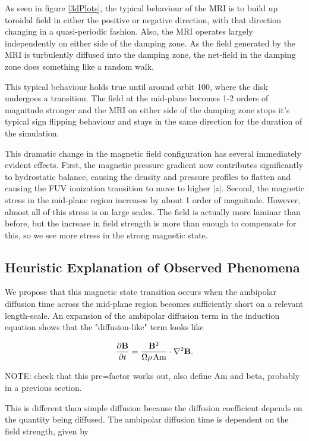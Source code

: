 As seen in figure \ref{3dPlots}, the typical behaviour of the MRI is to build up toroidal field in either the positive or negative direction, with that direction changing in a quasi-periodic fashion.  Also, the MRI operates largely independently on either side of the damping zone.  As the field generated by the MRI is turbulently diffused into the damping zone, the net-field in the damping zone does something like a random walk.  

This typical behaviour holds true until around orbit 100, where the disk undergoes a transition.  The field at the mid-plane becomes 1-2 orders of magnitude stronger and the MRI on either side of the damping zone stops it's typical sign flipping behaviour and stays in the same direction for the duration of the simulation.

This dramatic change in the magnetic field configuration has several immediately evident effects.  First, the magnetic pressure gradient now contributes significantly to hydrostatic balance, causing the density and pressure profiles to flatten and causing the FUV ionization transition to move to higher $|z|$.  Second, the magnetic stress in the mid-plane region increases by about 1 order of magnitude.  However, almost all of this stress is on large scales.  The field is actually more laminar than before, but the increase in field strength is more than enough to compensate for this, so we see more stress in the strong magnetic state.


\subsection{Heuristic Explanation of Observed Phenomena}
We propose that this magnetic state transition occurs when the ambipolar diffusion time across the mid-plane region becomes sufficiently short on a relevant length-scale.  An expansion of the ambipolar diffusion term in the induction equation shows that the "diffusion-like" term looks like

\begin{equation}
\frac{\partial \bold{B}}{\partial t} = \frac{\bold{B}^2}{\Omega \rho \hspace{0.5mm} \text{Am}} \cdot \nabla^2 \bold{B}.
\end{equation}

\noindent NOTE: check that this pre=factor works out, also define Am and beta, probably in a previous section.

\noindent This is different than simple diffusion because the diffusion coefficient depends on the quantity being diffused.  The ambipolar diffusion time is dependent on the field strength, given by 

